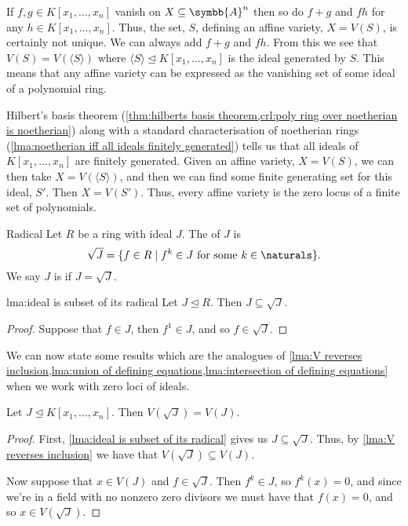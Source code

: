\documentclass[fleqn]{NotesClass}
\newcommand{\subideal}{\trianglelefteq}
\newcommand{\affine}{\symbb{A}}
\begin{document}
    If \(f, g \in K[x_1, \dotsc, x_n]\) vanish on \(X \subseteq \affine^n\) then so do \(f + g\) and \(f h\) for any \(h \in K[x_1, \dotsc, x_n]\).
    Thus, the set, \(S\), defining an affine variety, \(X = V(S)\), is certainly not unique.
    We can always add \(f + g\) and \(fh\).
    From this we see that \(V(S) = V(\langle S \rangle)\) where \(\langle S \rangle \subideal K[x_1, \dotsc, x_n]\) is the ideal generated by \(S\).
    This means that any affine variety can be expressed as the vanishing set of some ideal of a polynomial ring.
    
    Hilbert's basis theorem (\cref{thm:hilberts basis theorem,crl:poly ring over noetherian is noetherian}) along with a standard characterisation of noetherian rings (\cref{lma:noetherian iff all ideals finitely generated}) tells us that all ideals of \(K[x_1, \dotsc, x_n]\) are finitely generated.
    Given an affine variety, \(X = V(S)\), we can then take \(X = V(\langle S \rangle)\), and then we can find some finite generating set for this ideal, \(S'\).
    Then \(X = V(S')\).
    Thus, every affine variety is the zero locus of a finite set of polynomials.
    
    \begin{dfn}{Radical}{}
        Let \(R\) be a ring with ideal \(J\).
        The  of \(J\) is
        \begin{equation}
            \sqrt{J} = \{f \in R \mid f^k \in J \text{ for some } k \in \naturals\}.
        \end{equation}
        We say \(J\) is  if \(J = \sqrt{J}\).
    \end{dfn}
    
    \begin{lma}{}{lma:ideal is subset of its radical}
        Let \(J \subideal R\).
        Then \(J \subseteq \sqrt{J}\).
        \begin{proof}
            Suppose that \(f \in J\), then \(f^1 \in J\), and so \(f \in \sqrt{J}\).
        \end{proof}
    \end{lma}
    
    We can now state some results which are the analogues of \cref{lma:V reverses inclusion,lma:union of defining equations,lma:intersection of defining equations} when we work with zero loci of ideals.
    
    \begin{lma}{}{}
        Let \(J \subideal K[x_1, \dotsc, x_n]\).
        Then \(V(\sqrt{J}) = V(J)\).
        \begin{proof}
            First, \cref{lma:ideal is subset of its radical} gives us \(J \subseteq \sqrt{J}\).
            Thus, by \cref{lma:V reverses inclusion} we have that \(V(\sqrt{J}) \subseteq V(J)\).
            
            Now suppose that \(x \in V(J)\) and \(f \in \sqrt{J}\).
            Then \(f^k \in J\), so \(f^k(x) = 0\), and since we're in a field with no nonzero zero divisors we must have that \(f(x) = 0\), and so \(x \in V(\sqrt{J})\).
        \end{proof}
    \end{lma}
    
\end{document}
